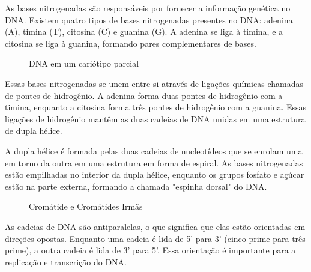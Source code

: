 \documentclass[11pt,a4paper]{article}
\begin{document}
	    As bases nitrogenadas são responsáveis por fornecer a informação genética no DNA. Existem quatro tipos de bases nitrogenadas presentes no DNA: adenina (A), timina (T), citosina (C) e guanina (G). A adenina se liga à timina, e a citosina se liga à guanina, formando pares complementares de bases.

		\begin{figure}
			\centering
			\caption{DNA em um cariótipo parcial}
			\label{fig:karyotype}
		\end{figure}

	    Essas bases nitrogenadas se unem entre si através de ligações químicas chamadas de pontes de hidrogênio. A adenina forma duas pontes de hidrogênio com a timina, enquanto a citosina forma três pontes de hidrogênio com a guanina. Essas ligações de hidrogênio mantêm as duas cadeias de DNA unidas em uma estrutura de dupla hélice.

	    A dupla hélice é formada pelas duas cadeias de nucleotídeos que se enrolam uma em torno da outra em uma estrutura em forma de espiral. As bases nitrogenadas estão empilhadas no interior da dupla hélice, enquanto os grupos fosfato e açúcar estão na parte externa, formando a chamada "espinha dorsal" do DNA.

		\begin{figure}
			\caption{Cromátide e Cromátides Irmãs}
			\label{fig:cromatides}
		\end{figure}
	
		
	    As cadeias de DNA são antiparalelas, o que significa que elas estão orientadas em direções opostas. Enquanto uma cadeia é lida de 5' para 3' (cinco prime para três prime), a outra cadeia é lida de 3' para 5'. Essa orientação é importante para a replicação e transcrição do DNA.
\end{document}

